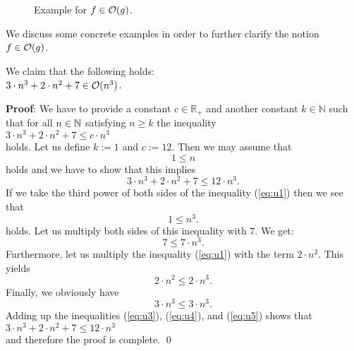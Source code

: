 \begin{figure}[!ht]
  \centering
  \caption{Example for $f \in \mathcal{O}(g)$.} %
  \label{fig:big-o.eps}
\end{figure}


\noindent
We discuss some concrete examples in order to further clarify the notion $f \in \mathcal{O}(g)$.

\example
We claim that the following holds:
\\[0.2cm]
\hspace*{1.3cm}
$3 \cdot n^3 + 2 \cdot n^2 + 7 \in \mathcal{O}(n^3)$. 
\ex

\noindent
\textbf{Proof}:  We have to  provide a constant $c\in\mathbb{R}_+$ and another constant $k\in\mathbb{N}$ such that for all $n\in
{\mathbb N}$ satisfying
$n \geq k$ the inequality
\\[0.2cm]
\hspace*{1.3cm} 
$3 \cdot n^3 + 2 \cdot n^2 + 7 \leq c \cdot n^3$
\\[0.2cm]
holds.  Let us define  $k := 1$ and $c := 12$.  Then we may assume that 
\begin{equation}
  \label{eq:u1}
  1\leq n  
\end{equation}
holds and we have to show that this implies 
\begin{equation}
  \label{eq:u2}
  3 \cdot n^3 + 2 \cdot n^2 + 7 \leq 12 \cdot n^3.
\end{equation}
If we take the third power of both sides of the inequality (\ref{eq:u1}) then we see that
\begin{equation}
  \label{eq:u3pre}
  1 \leq n^3.
\end{equation}
holds.  Let us multiply both sides of this inequality with $7$.  We get: 
\begin{equation}
  \label{eq:u3}
  7 \leq 7 \cdot n^3.
\end{equation}
Furthermore, let us multiply the inequality (\ref{eq:u1}) with the term $2\cdot n^2$.  This yields
\begin{equation}
  \label{eq:u4}
  2 \cdot n^2 \leq 2 \cdot n^3.
\end{equation}
Finally, we obviously have
\begin{equation}
  \label{eq:u5}
  3 \cdot n^3 \leq 3 \cdot n^3.
\end{equation}
Adding up the inequalities (\ref{eq:u3}), (\ref{eq:u4}), and (\ref{eq:u5}) shows that \\[0.2cm]
\hspace*{1.3cm} $3 \cdot n^3 + 2 \cdot n^2 + 7 \leq 12 \cdot n^3$ \\[0.2cm]
and therefore the proof is complete. \qed

